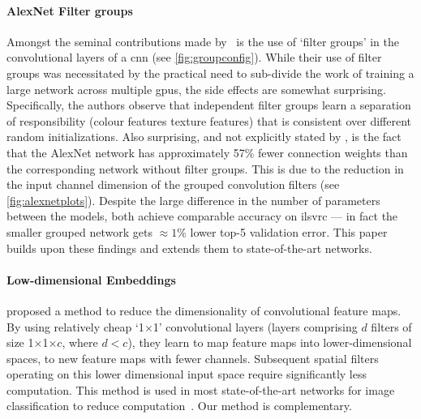 \documentclass[thesis]{subfiles}
\begin{document}
	\paragraph{AlexNet Filter groups} Amongst the seminal contributions made by \citet{Krizhevsky2012}~is the use of `filter groups' in the convolutional layers of a \gls{cnn} (see \cref{fig:groupconfig}). While their use of filter groups was necessitated by the practical need to sub-divide the work of training a large network across multiple \gls{gpu}s, the side effects are somewhat surprising. Specifically, the authors observe that independent filter groups learn a separation of responsibility (colour features \vs{}texture features) that is consistent over different random initializations. Also surprising, and not explicitly stated by \citet{Krizhevsky2012}, is the fact that the AlexNet network has approximately 57\% fewer connection weights than the corresponding network without filter groups. This is due to the reduction in the input channel dimension of the grouped convolution filters (see \cref{fig:alexnetplots}).
	Despite the large difference in the number of parameters between the models, both achieve comparable accuracy on \gls{ilsvrc} --- in fact the smaller grouped network gets $\approx1$\% lower top-5 validation error. This paper builds upon these findings and extends them to state-of-the-art networks.
	
	\paragraph{Low-dimensional Embeddings}
	\citet{Lin2013NiN} proposed a method to reduce the dimensionality of convolutional feature maps. 
	By using relatively cheap `1$\times$1' convolutional layers (\ie layers comprising $d$ filters of size 1$\times$1$\times$$c$, where $d<c$), they learn to map feature maps into lower-dimensional spaces, \ie to new feature maps with fewer channels. Subsequent spatial filters operating on this lower dimensional input space require significantly less computation. This method is used in most state-of-the-art networks for image classification to reduce computation~\citep{Szegedy2014going,He2015}. Our method is complementary.
	
\end{document}
